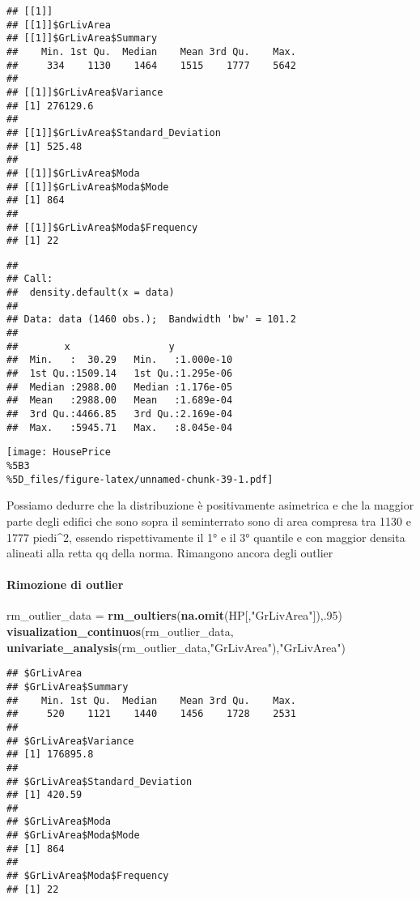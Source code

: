 \documentclass[
]{article}
\newenvironment{Shaded}{\begin{snugshade}}{\end{snugshade}}
\newcommand{\DecValTok}[1]{\textcolor[rgb]{0.00,0.00,0.81}{#1}}
\newcommand{\FunctionTok}[1]{\textcolor[rgb]{0.13,0.29,0.53}{\textbf{#1}}}
\newcommand{\NormalTok}[1]{#1}
\newcommand{\OtherTok}[1]{\textcolor[rgb]{0.56,0.35,0.01}{#1}}
\newcommand{\StringTok}[1]{\textcolor[rgb]{0.31,0.60,0.02}{#1}}
\begin{document}
\begin{verbatim}
## [[1]]
## [[1]]$GrLivArea
## [[1]]$GrLivArea$Summary
##    Min. 1st Qu.  Median    Mean 3rd Qu.    Max. 
##     334    1130    1464    1515    1777    5642 
## 
## [[1]]$GrLivArea$Variance
## [1] 276129.6
## 
## [[1]]$GrLivArea$Standard_Deviation
## [1] 525.48
## 
## [[1]]$GrLivArea$Moda
## [[1]]$GrLivArea$Moda$Mode
## [1] 864
## 
## [[1]]$GrLivArea$Moda$Frequency
## [1] 22
\end{verbatim}

\begin{verbatim}
## 
## Call:
##  density.default(x = data)
## 
## Data: data (1460 obs.);  Bandwidth 'bw' = 101.2
## 
##        x                 y            
##  Min.   :  30.29   Min.   :1.000e-10  
##  1st Qu.:1509.14   1st Qu.:1.295e-06  
##  Median :2988.00   Median :1.176e-05  
##  Mean   :2988.00   Mean   :1.689e-04  
##  3rd Qu.:4466.85   3rd Qu.:2.169e-04  
##  Max.   :5945.71   Max.   :8.045e-04
\end{verbatim}

\texttt{[image: HousePrice\\\%5B3\\\%5D\_files/figure-latex/unnamed-chunk-39-1.pdf]}

Possiamo dedurre che la distribuzione è positivamente asimetrica e che
la maggior parte degli edifici che sono sopra il seminterrato sono di
area compresa tra 1130 e 1777 piedi\^{}2, essendo rispettivamente il 1°
e il 3° quantile e con maggior densita alineati alla retta qq della
norma. Rimangono ancora degli outlier

\paragraph{Rimozione di outlier}\label{rimozione-di-outlier-8}

\begin{Shaded}
\begin{Highlighting}[]
\NormalTok{rm\_outlier\_data }\OtherTok{=} \FunctionTok{rm\_oultiers}\NormalTok{(}\FunctionTok{na.omit}\NormalTok{(HP[,}\StringTok{"GrLivArea"}\NormalTok{]),.}\DecValTok{95}\NormalTok{)}
\FunctionTok{visualization\_continuos}\NormalTok{(rm\_outlier\_data, }\FunctionTok{univariate\_analysis}\NormalTok{(rm\_outlier\_data,}\StringTok{"GrLivArea"}\NormalTok{),}\StringTok{"GrLivArea"}\NormalTok{)}
\end{Highlighting}
\end{Shaded}

\begin{verbatim}
## $GrLivArea
## $GrLivArea$Summary
##    Min. 1st Qu.  Median    Mean 3rd Qu.    Max. 
##     520    1121    1440    1456    1728    2531 
## 
## $GrLivArea$Variance
## [1] 176895.8
## 
## $GrLivArea$Standard_Deviation
## [1] 420.59
## 
## $GrLivArea$Moda
## $GrLivArea$Moda$Mode
## [1] 864
## 
## $GrLivArea$Moda$Frequency
## [1] 22
\end{verbatim}
\end{document}
